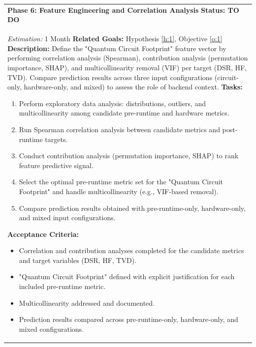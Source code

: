 \documentclass{article}
\begin{document}
\begin{longtable}{@{}p{\textwidth}@{}}
    \textbf{Phase 6: Feature Engineering and Correlation Analysis} \label{p:6} \hfill \textbf{Status: TO DO} \\
    \textit{Estimation:} 1 Month \newline
    \textbf{Related Goals:} Hypothesis \ref{h:1}, Objective \ref{o:1} \newline
    \textbf{Description:} Define the "Quantum Circuit Footprint" feature vector by performing correlation analysis (Spearman), contribution analysis (permutation importance, SHAP), and multicollinearity removal (VIF) per target (DSR, HF, TVD). Compare prediction results across three input configurations (circuit-only, hardware-only, and mixed) to assess the role of backend context. \newline
    \textbf{Tasks:}
    \begin{enumerate}[label=T6.\arabic*, ref=T6.\arabic*, font=\bfseries, leftmargin=3.5em, labelindent=0pt, itemindent=0pt, labelsep=0.5em, noitemsep, topsep=0pt]
        \item \label{p6:t1} Perform exploratory data analysis: distributions, outliers, and multicollinearity among candidate pre-runtime and hardware metrics.
        \item \label{p6:t2} Run Spearman correlation analysis between candidate metrics and post-runtime targets.
        \item \label{p6:t3} Conduct contribution analysis (permutation importance, SHAP) to rank feature predictive signal.
        \item \label{p6:t4} Select the optimal pre-runtime metric set for the "Quantum Circuit Footprint" and handle multicollinearity (e.g., VIF-based removal).
        \item \label{p6:t5} Compare prediction results obtained with pre-runtime-only, hardware-only, and mixed input configurations.
    \end{enumerate}
    \textbf{Acceptance Criteria:}
    \begin{itemize}[leftmargin=1.5em, labelindent=0pt, itemindent=0pt, noitemsep, topsep=0pt]
        \item Correlation and contribution analyses completed for the candidate metrics and target variables (DSR, HF, TVD).
        \item "Quantum Circuit Footprint" defined with explicit justification for each included pre-runtime metric.
        \item Multicollinearity addressed and documented.
        \item Prediction results compared across pre-runtime-only, hardware-only, and mixed configurations.
    \end{itemize} \\
    \midrule
    

\end{longtable}
\end{document}
